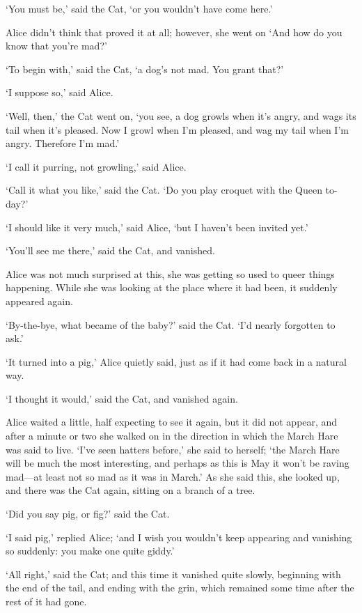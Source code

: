 \documentclass[12pt]{book}
\begin{document}
\begin{Parallel}[p]{}{}
{‘You must be,’ said the Cat, ‘or you wouldn’t have come here.’

Alice didn’t think that proved it at all; however, she went on ‘And how do you know that you’re mad?’

‘To begin with,’ said the Cat, ‘a dog’s not mad. You grant that?’

‘I suppose so,’ said Alice.

‘Well, then,’ the Cat went on, ‘you see, a dog growls when it’s angry, and wags its tail when it’s pleased. Now I growl when I’m pleased, and wag my tail when I’m angry. Therefore I’m mad.’

‘I call it purring, not growling,’ said Alice.

‘Call it what you like,’ said the Cat. ‘Do you play croquet with the Queen to-day?’

‘I should like it very much,’ said Alice, ‘but I haven’t been invited yet.’

‘You’ll see me there,’ said the Cat, and vanished.

Alice was not much surprised at this, she was getting so used to queer things happening. While she was looking at the place where it had been, it suddenly appeared again.

‘By-the-bye, what became of the baby?’ said the Cat. ‘I’d nearly forgotten to ask.’

‘It turned into a pig,’ Alice quietly said, just as if it had come back in a natural way.

‘I thought it would,’ said the Cat, and vanished again.

Alice waited a little, half expecting to see it again, but it did not appear, and after a minute or two she walked on in the direction in which the March Hare was said to live. ‘I’ve seen hatters before,’ she said to herself; ‘the March Hare will be much the most interesting, and perhaps as this is May it won’t be raving mad—at least not so mad as it was in March.’ As she said this, she looked up, and there was the Cat again, sitting on a branch of a tree.

‘Did you say pig, or fig?’ said the Cat.

‘I said pig,’ replied Alice; ‘and I wish you wouldn’t keep appearing and vanishing so suddenly: you make one quite giddy.’

‘All right,’ said the Cat; and this time it vanished quite slowly, beginning with the end of the tail, and ending with the grin, which remained some time after the rest of it had gone.

}
\end{Parallel}
\end{document}

